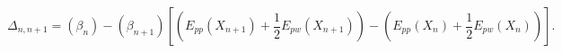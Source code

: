 \begin{center}
    \begin{equation}
        \Delta_{n,n+1} = (\beta_{n}) - (\beta_{n+1})[(E_{pp}(X_{n+1}) + \frac{1}{2}E_{pw}(X_{n+1})) - (E_{pp}(X_{n}) + \frac{1}{2}E_{pw}(X_{n}))].
        \label{eq:rest1_AR}
    \end{equation}
\end{center}